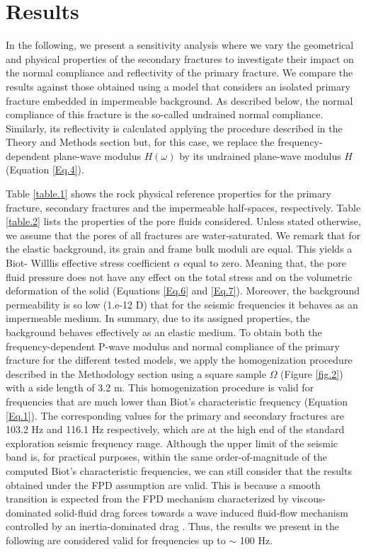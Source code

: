 \documentclass[draft]{agujournal2019}
\begin{document}
\section{Results}

In the following, we present a sensitivity analysis where we vary the geometrical and physical properties of the secondary fractures to investigate their impact on the normal compliance and reflectivity of the primary fracture. 
We compare the  results against those obtained using a model that considers an isolated  primary fracture embedded in impermeable background. As described below, the normal compliance of this fracture is the so-called undrained normal compliance. Similarly, its reflectivity is calculated applying the procedure described in the Theory and Methods section but, for this case, we replace the frequency-dependent plane-wave modulus $H(\omega)$ by its undrained plane-wave modulus $H$ (Equation \eqref{Eq.4}). 

Table \ref{table.1} shows the rock physical reference properties for the primary fracture, secondary fractures and the impermeable half-spaces, respectively. Table \ref{table.2} lists the properties of the pore fluids considered.
Unless stated otherwise, we assume that the pores of all fractures are water-saturated. We remark that for the elastic background, its grain and frame bulk moduli are equal. This yields a Biot- Willlis effective stress coefficient $\alpha$ equal to zero. Meaning that, the pore fluid pressure does not have any effect on the total stress and on the volumetric deformation of the solid (Equations \eqref{Eq.6} and \eqref{Eq.7}). Moreover, the background permeability is so low (1.e-12 D) that for the seismic frequencies it behaves as an impermeable medium. In summary, due to its assigned properties, the background behaves effectively as an elastic medium.
To obtain both the frequency-dependent P-wave modulus and normal compliance of the primary fracture for the different tested models,  we apply the homogenization procedure described in the Methodology section using a square sample $\Omega$ (Figure \ref{fig.2}) with a side length of 3.2 m. This homogenization procedure is valid for frequencies that are much lower than Biot's characteristic frequency (Equation \eqref{Eq.1}). The corresponding values for the primary and secondary fractures are 103.2 Hz and 116.1 Hz respectively, which are at the high end of the standard exploration seismic frequency range. Although the upper limit of the seismic band is, for practical purposes, within the same order-of-magnitude of the computed Biot's characteristic frequencies, we can still consider that the results obtained under the FPD assumption are valid. This is because a smooth transition is expected from the FPD mechanism characterized by viscous-dominated solid-fluid drag forces towards a wave induced fluid-flow mechanism controlled by an inertia-dominated drag \cite{Rubino2014}. Thus, the results we present in the following are considered valid for frequencies up to $\sim$ 100 Hz.
\end{document}
